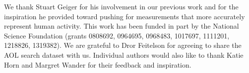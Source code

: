We thank Stuart Geiger for his involvement in our previous work and for the inspiration he provided toward pushing for measurements that more accurately represent human activity.  This work has been funded in part by the National Science Foundation (grants 0808692, 0964695, 0968483, 1017697, 1111201, 1218826, 1319382).  We are grateful to Dror Feitelson for agreeing to share the AOL search dataset with us. Individual authors would also like to thank Katie Horn and Margret Wander for their feedback and inspiration.
